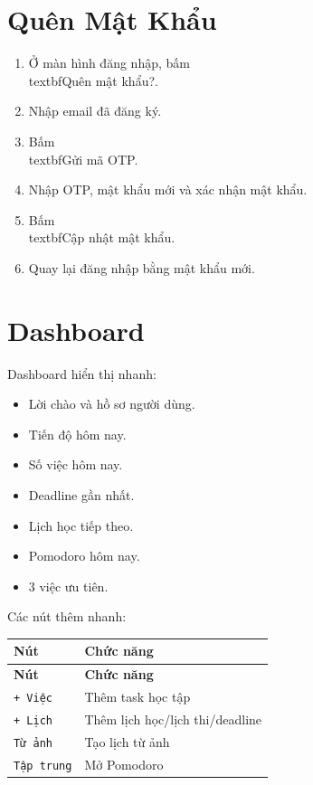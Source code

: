 \documentclass[12pt,a4paper]{report}
\begin{document}
\section{Quên Mật Khẩu}

\begin{enumerate}
\item Ở màn hình đăng nhập, bấm \\textbf{Quên mật khẩu?}.
\item Nhập email đã đăng ký.
\item Bấm \\textbf{Gửi mã OTP}.
\item Nhập OTP, mật khẩu mới và xác nhận mật khẩu.
\item Bấm \\textbf{Cập nhật mật khẩu}.
\item Quay lại đăng nhập bằng mật khẩu mới.
\end{enumerate}

\section{Dashboard}

Dashboard hiển thị nhanh:

\begin{itemize}
\item Lời chào và hồ sơ người dùng.
\item Tiến độ hôm nay.
\item Số việc hôm nay.
\item Deadline gần nhất.
\item Lịch học tiếp theo.
\item Pomodoro hôm nay.
\item 3 việc ưu tiên.
\end{itemize}

Các nút thêm nhanh:

\begin{longtable}{|>{\raggedright\arraybackslash}p{}|>{\raggedright\arraybackslash}p{}|}
\hline
\textbf{Nút} & \textbf{Chức năng} \\ \hline
\endfirsthead
\hline
\textbf{Nút} & \textbf{Chức năng} \\ \hline
\endhead
\texttt{+ Việc} & Thêm task học tập \\ \hline
\texttt{+ Lịch} & Thêm lịch học/lịch thi/deadline \\ \hline
\texttt{Từ ảnh} & Tạo lịch từ ảnh \\ \hline
\texttt{Tập trung} & Mở Pomodoro \\ \hline
\end{longtable}
\end{document}
